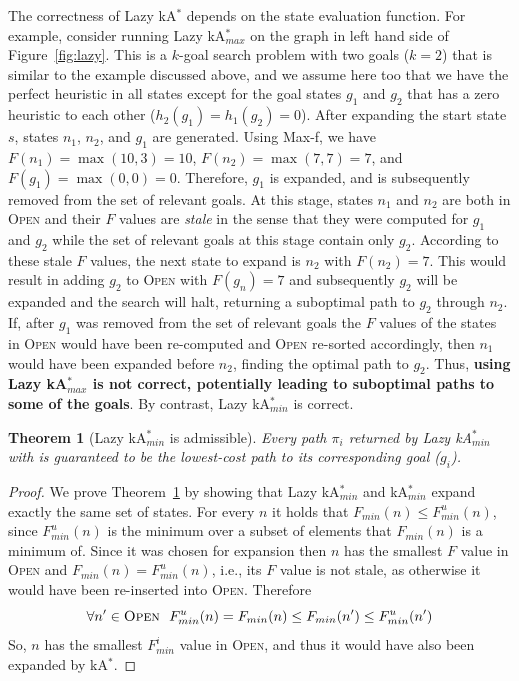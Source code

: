 \documentclass{aicom2e}
\newtheorem{theorem}{Theorem}
\newcommand{\kgs}{$k$-goal search}
\newcommand{\kastar}{kA$^*$}
\newcommand{\kastarmin}{kA$^*_{min}$}
\newcommand{\kastarmax}{kA$^*_{max}$}
\newcommand{\maxf}{Max-f}
\newcommand{\open}{\textsc{Open}}
\begin{document}
The correctness of Lazy \kastar{} depends on the state evaluation function. For example, consider running Lazy \kastarmax{} on the graph in left hand side of Figure~\ref{fig:lazy}. This is a \kgs{} problem with two goals ($k=2$) that is similar to the example discussed above, and we assume here too that we have the perfect heuristic in all states except for the goal states $g_1$ and $g_2$ that has a zero heuristic to each other ($h_2(g_1)=h_1(g_2)=0$). After expanding the start state $s$, states $n_1$, $n_2$, and $g_1$ are generated. Using \maxf{}, we have $F(n_1)=\max(10,3)=10$, $F(n_2)=\max(7,7)=7$, and $F(g_1)=\max(0,0)=0$. Therefore, $g_1$ is expanded, and is subsequently removed from the set of relevant goals. At this stage, states $n_1$ and $n_2$ are both in \open{} and their $F$ values are {\em stale} in the sense that they were computed for $g_1$ and $g_2$ while the set of relevant goals at this stage contain only $g_2$. According to these stale $F$ values, the next state to expand is $n_2$ with $F(n_2)=7$. This would result in adding $g_2$ to \open{} with $F(g_n)=7$ and subsequently $g_2$ will be expanded and the search will halt, returning a suboptimal path to $g_2$ through $n_2$. If, after $g_1$ was removed from the set of relevant goals the $F$ values of the states in \open{} would have been re-computed and \open{} re-sorted accordingly, then $n_1$ would have been expanded before $n_2$, finding the optimal path to $g_2$. Thus, {\bf using Lazy \kastarmax{} is not correct, potentially leading to suboptimal paths to some of the goals}. By contrast, Lazy \kastarmin{} is correct. 


\begin{theorem}[Lazy \kastarmin{} is admissible]
Every path $\pi_i$ returned by Lazy \kastarmin{} with is guaranteed to be the lowest-cost path to its corresponding goal ($g_i$).
\label{the:lazy-minf-correct}
\end{theorem}
\begin{proof}
	We prove Theorem~\ref{the:lazy-minf-correct} by showing that Lazy \kastarmin{} and \kastarmin{}  expand exactly the same set of states. For every $n$ it holds that $F_{min}(n)\leq F^u_{min}(n)$, since $F^u_{min}(n)$ is the minimum over a subset of elements that $F_{min}(n)$ is a minimum of. 
	Since it was chosen for expansion then $n$ has the smallest $F$ value in \open{}
	and $F_{min}(n)=F^u_{min}(n)$, i.e., its $F$ value is not stale, as otherwise it would have been re-inserted into \open{}. Therefore 
	\[ \forall n'\in\open{} ~~ F^u_{min}(n)=F_{min}(n)\leq F_{min}(n') \leq F^u_{min}(n') \]
	So, $n$ has the smallest $F^i_{min}$ value in \open{}, and thus it would have also been expanded by \kastar{}. 
\end{proof}
\end{document}
